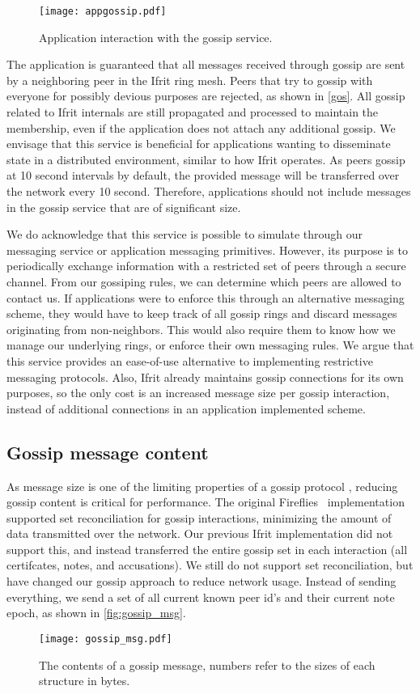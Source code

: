 \documentclass[USenglish]{uit-thesis}
\begin{document}
\begin{figure}[h]
	\centering
	\texttt{[image: appgossip.pdf]}
	\caption{Application interaction with the gossip service.}
	\label{fig:appgossip}
\end{figure}

The application is guaranteed that all messages received through gossip are sent by a neighboring peer in the Ifrit ring mesh.
Peers that try to gossip with everyone for possibly devious purposes are rejected, as shown in \autoref{gos}.
All gossip related to Ifrit internals are still propagated and processed to maintain the membership, even if the application does not attach any additional gossip. 
We envisage that this service is beneficial for applications wanting to disseminate state in a distributed environment, similar to how Ifrit operates.
As peers gossip at 10 second intervals by default, the provided message will be transferred over the network every 10 second.
Therefore, applications should not include messages in the gossip service that are of significant size.

We do acknowledge that this service is possible to simulate through our messaging service or application messaging primitives.
However, its purpose is to periodically exchange information with a restricted set of peers through a secure channel.
From our gossiping rules, we can determine which peers are allowed to contact us.
If applications were to enforce this through an alternative messaging scheme, they would have to keep track of all gossip rings and discard messages originating from non-neighbors.
This would also require them to know how we manage our underlying rings, or enforce their own messaging rules.
We argue that this service provides an ease-of-use alternative to implementing restrictive messaging protocols.
Also, Ifrit already maintains gossip connections for its own purposes, so the only cost is an increased message size per gossip interaction, instead of additional connections in an application implemented scheme.
 

\subsection{Gossip message content}
As message size is one of the limiting properties of a gossip protocol \cite{propa}, reducing gossip content is critical for performance.
The original Fireflies~\cite{flies} implementation supported set reconciliation \cite{set_rec} for gossip interactions, minimizing the amount of data transmitted over the network.
Our previous Ifrit implementation did not support this, and instead transferred the entire gossip set in each interaction (all certifcates, notes, and accusations).
We still do not support set reconciliation, but have changed our gossip approach to reduce network usage.
Instead of sending everything, we send a set of all current known peer id's and their current note epoch, as shown in \autoref{fig:gossip_msg}.
\begin{figure}[h]
	\centering
	\texttt{[image: gossip\_msg.pdf]}
	\caption{The contents of a gossip message, numbers refer to the sizes of each structure in bytes.}
	\label{fig:gossip_msg}
\end{figure}
\end{document}
